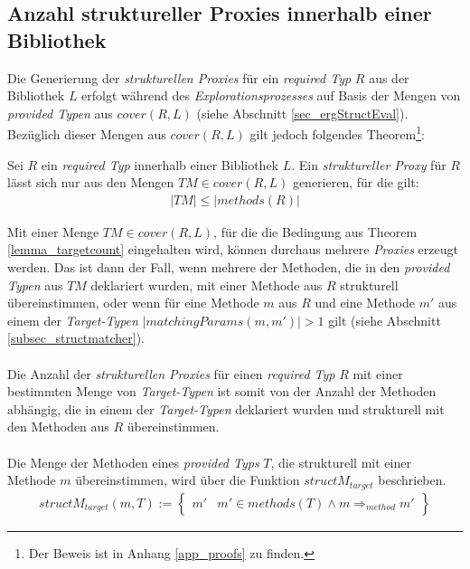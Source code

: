 \subsection{Anzahl struktureller Proxies innerhalb einer Bibliothek}\label{sec_anzahlProxies}
Die Generierung der \emph{strukturellen Proxies} für ein \emph{required Typ} $R$ aus der Bibliothek $L$ erfolgt während des \emph{Explorationsprozesses} auf Basis der Mengen von \emph{provided Typen} aus $\mathit{cover(R,L)}$ (siehe Abschnitt \ref{sec_ergStructEval}). Bezüglich dieser Mengen aus $\mathit{cover(R,L)}$ gilt jedoch folgendes Theorem\footnote{Der Beweis ist in Anhang \ref{app_proofs} zu finden.}:
\begin{theorem}\label{lemma_targetcount}
Sei $R$ ein \emph{required Typ} innerhalb einer Bibliothek $L$. 
Ein \emph{struktureller Proxy} für $R$ lässt sich nur aus den Mengen $\mathit{TM} \in \mathit{cover(R,L)}$ generieren, für die gilt:
\begin{gather*}
|\mathit{TM}| \leq |\mathit{methods(R)}|
\end{gather*}
\end{theorem}
\noindent
Mit einer Menge $\mathit{TM} \in \mathit{cover(R,L)}$, für die die Bedingung aus Theorem \ref{lemma_targetcount} eingehalten wird, können durchaus mehrere \emph{Proxies} erzeugt werden. Das ist dann der Fall, wenn mehrere der Methoden, die in den \emph{provided Typen} aus $\mathit{TM}$ deklariert wurden, mit einer Methode aus $R$ strukturell übereinstimmen, oder wenn für eine Methode $m$ aus $R$ und eine Methode $m'$ aus einem der \emph{Target-Typen} $|matchingParams(m,m')| > 1$ gilt (siehe Abschnitt \ref{subsec_structmatcher}).
\\\\
Die Anzahl der \emph{strukturellen Proxies} für einen \emph{required Typ} $R$ mit einer bestimmten Menge von \emph{Target-Typen} ist somit von der Anzahl der Methoden abhängig, die in einem der \emph{Target-Typen} deklariert wurden und strukturell mit den Methoden aus $R$ übereinstimmen. 
\\\\
Die Menge der Methoden eines \emph{provided Typs} $T$, die strukturell mit einer Methode $m$ übereinstimmen, wird über die Funktion $\mathit{structM_{target}}$ beschrieben.
\begin{gather*}
\mathit{structM_{target}(m, T)} := 
\left\{\begin{array}{l|l}
m'	& m' \in \mathit{methods(T)} \wedge  m \Rightarrow_{method} m'
\end{array}
\right\}
\end{gather*}

